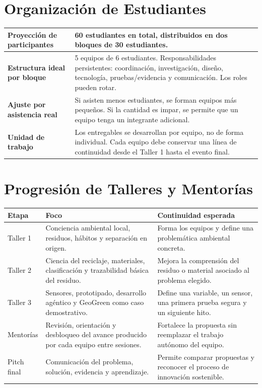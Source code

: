 \documentclass[10pt,letterpaper]{article}
\begin{document}
\section{Organización de Estudiantes}

\begin{tabularx}{\textwidth}{L{4.2cm}Y}
\hline
\textbf{Proyección de participantes} & 60 estudiantes en total, distribuidos en dos bloques de 30 estudiantes. \\
\hline
\textbf{Estructura ideal por bloque} & 5 equipos de 6 estudiantes. Responsabilidades persistentes: coordinación, investigación, diseño, tecnología, pruebas/evidencia y comunicación. Los roles pueden rotar. \\
\hline
\textbf{Ajuste por asistencia real} & Si asisten menos estudiantes, se forman equipos más pequeños. Si la cantidad es impar, se permite que un equipo tenga un integrante adicional. \\
\hline
\textbf{Unidad de trabajo} & Los entregables se desarrollan por equipo, no de forma individual. Cada equipo debe conservar una línea de continuidad desde el Taller 1 hasta el evento final. \\
\hline
\end{tabularx}

\section{Progresión de Talleres y Mentorías}

\begin{tabularx}{\textwidth}{L{2.6cm}L{4.6cm}Y}
\hline
\textbf{Etapa} & \textbf{Foco} & \textbf{Continuidad esperada} \\
\hline
Taller 1 & Conciencia ambiental local, residuos, hábitos y separación en origen. & Forma los equipos y define una problemática ambiental concreta. \\
\hline
Taller 2 & Ciencia del reciclaje, materiales, clasificación y trazabilidad básica del residuo. & Mejora la comprensión del residuo o material asociado al problema elegido. \\
\hline
Taller 3 & Sensores, prototipado, desarrollo agéntico y GeoGreen como caso demostrativo. & Define una variable, un sensor, una primera prueba segura y un siguiente hito. \\
\hline
Mentorías & Revisión, orientación y desbloqueo del avance producido por cada equipo entre sesiones. & Fortalece la propuesta sin reemplazar el trabajo autónomo del equipo. \\
\hline
Pitch final & Comunicación del problema, solución, evidencia y aprendizaje. & Permite comparar propuestas y reconocer el proceso de innovación sostenible. \\
\hline
\end{tabularx}
\end{document}
